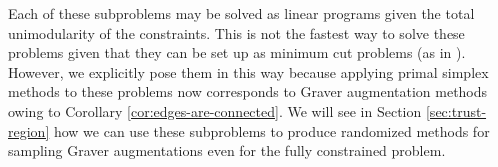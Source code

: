 \documentclass[pdflatex,sn-mathphys-num]{sn-jnl}%
\DeclareMathOperator{\Vcal}{\mathcal{V}}
\begin{document}
Each of these subproblems may be solved as linear programs given the total unimodularity of the constraints. This is not the fastest way to solve these problems given that they can be set up as minimum cut problems (as in \cite{kolmogorov2009new}).
However, we explicitly pose them in this way because applying primal simplex methods to these problems now corresponds to Graver augmentation methods owing to Corollary \ref{cor:edges-are-connected}.
We will see in Section \ref{sec:trust-region} how we can use these subproblems to produce randomized methods for sampling Graver augmentations even for the fully constrained problem.


\end{document}
